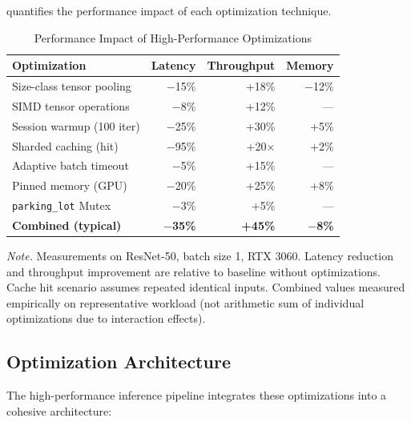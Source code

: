 \documentclass[10pt,twocolumn,a4paper]{article}
\theoremstyle{definition}
\theoremstyle{plain}
\begin{document}
 quantifies the performance impact of each optimization technique.

\begin{table}[t]
\centering
\caption{Performance Impact of High-Performance Optimizations}
\label{tab:optimization_impact}
\scriptsize
\setlength{\tabcolsep}{3pt}
\begin{tabular}{@{}lrrr@{}}
\toprule
\textbf{Optimization} & \textbf{Latency} & \textbf{Throughput} & \textbf{Memory} \\
\midrule
Size-class tensor pooling & $-$15\% & +18\% & $-$12\% \\
SIMD tensor operations & $-$8\% & +12\% & --- \\
Session warmup (100 iter) & $-$25\% & +30\% & +5\% \\
Sharded caching (hit) & $-$95\% & +20$\times$ & +2\% \\
Adaptive batch timeout & $-$5\% & +15\% & --- \\
Pinned memory (GPU) & $-$20\% & +25\% & +8\% \\
\texttt{parking\_lot} Mutex & $-$3\% & +5\% & --- \\
\midrule
\textbf{Combined (typical)} & \textbf{$-$35\%} & \textbf{+45\%} & \textbf{$-$8\%} \\
\bottomrule
\end{tabular}

\vspace{0.5em}
\noindent\textit{Note.} Measurements on ResNet-50, batch size 1, RTX 3060. Latency reduction and throughput improvement are relative to baseline without optimizations. Cache hit scenario assumes repeated identical inputs. Combined values measured empirically on representative workload (not arithmetic sum of individual optimizations due to interaction effects).
\end{table}

\subsection{Optimization Architecture}

The high-performance inference pipeline integrates these optimizations into a cohesive architecture:
\end{document}
